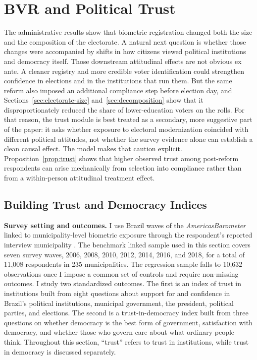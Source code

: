 \section{BVR and Political Trust}
\label{sec:political-trust}

The administrative results show that biometric registration changed both the size and the composition of the electorate. A natural next question is whether those changes were accompanied by shifts in how citizens viewed political institutions and democracy itself. Those downstream attitudinal effects are not obvious ex ante. A cleaner registry and more credible voter identification could strengthen confidence in elections and in the institutions that run them. But the same reform also imposed an additional compliance step before election day, and Sections~\ref{sec:electorate-size} and~\ref{sec:decomposition} show that it disproportionately reduced the share of lower-education voters on the rolls. For that reason, the trust module is best treated as a secondary, more suggestive part of the paper: it asks whether exposure to electoral modernization coincided with different political attitudes, not whether the survey evidence alone can establish a clean causal effect. The model makes that caution explicit. Proposition~\ref{prop:trust} shows that higher observed trust among post-reform respondents can arise mechanically from selection into compliance rather than from a within-person attitudinal treatment effect.

\subsection{Building Trust and Democracy Indices}

\textbf{Survey setting and outcomes.} I use Brazil waves of the \LAPOP{} \textit{AmericasBarometer} linked to municipality-level biometric exposure through the respondent's reported interview municipality \citep{lapop_americasbarometer}. The benchmark linked sample used in this section covers seven survey waves, 2006, 2008, 2010, 2012, 2014, 2016, and 2018, for a total of 11{,}008 respondents in 235 municipalities. The regression sample falls to 10{,}632 observations once I impose a common set of controls and require non-missing outcomes. I study two standardized outcomes. The first is an index of trust in institutions built from eight questions about support for and confidence in Brazil's political institutions, municipal government, the president, political parties, and elections. The second is a trust-in-democracy index built from three questions on whether democracy is the best form of government, satisfaction with democracy, and whether those who govern care about what ordinary people think. Throughout this section, ``trust'' refers to trust in institutions, while trust in democracy is discussed separately.

